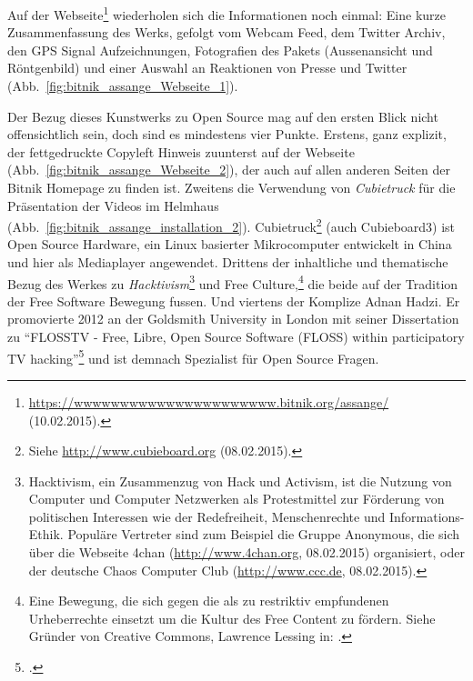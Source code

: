 \documentclass[
paper=164mm:234mm, %
pagesize, %
DIV=calc, %
10pt, %
parskip=half- %
]{scrbook}
\begin{document}
Auf der Webseite\footnote{\url{https://wwwwwwwwwwwwwwwwwwwwww.bitnik.org/assange/} (10.02.2015).} wiederholen sich die Informationen noch einmal: Eine kurze Zusammenfassung des Werks, gefolgt vom Webcam Feed, dem Twitter Archiv, den GPS Signal Aufzeichnungen, Fotografien des Pakets (Aussenansicht und Röntgenbild) und einer Auswahl an Reaktionen von Presse und Twitter (Abb.~\ref{fig:bitnik_assange_Webseite_1}).

Der Bezug dieses Kunstwerks zu Open Source mag auf den ersten Blick nicht offensichtlich sein, doch sind es mindestens vier Punkte. Erstens, ganz explizit, der fettgedruckte Copyleft Hinweis zuunterst auf der Webseite (Abb.~\ref{fig:bitnik_assange_Webseite_2}), der auch auf allen anderen Seiten der Bitnik Homepage zu finden ist. Zweitens die Verwendung von \emph{Cubietruck} für die Präsentation der Videos im Helmhaus (Abb.~\ref{fig:bitnik_assange_installation_2}). Cubietruck\footnote{Siehe \url{http://www.cubieboard.org} (08.02.2015).} (auch Cubieboard3) ist Open Source Hardware, ein Linux basierter Mikrocomputer entwickelt in China und hier als Mediaplayer angewendet. Drittens der inhaltliche und thematische Bezug des Werkes zu \emph{Hacktivism}\footnote{Hacktivism, ein Zusammenzug von Hack und Activism, ist die Nutzung von Computer und Computer Netzwerken als Protestmittel zur Förderung von politischen Interessen wie der Redefreiheit, Menschenrechte und Informations-Ethik. Populäre Vertreter sind zum Beispiel die Gruppe Anonymous, die sich über die Webseite 4chan (\url{http://www.4chan.org}, 08.02.2015) organisiert, oder der deutsche Chaos Computer Club (\url{http://www.ccc.de}, 08.02.2015).} und Free Culture,\footnote{Eine Bewegung, die sich gegen die als zu restriktiv empfundenen Urheberrechte einsetzt um die Kultur des Free Content zu fördern. Siehe Gründer von Creative Commons, Lawrence Lessing in: \cite[276-286]{Lessing:2004}.} die beide auf der Tradition der Free Software Bewegung fussen. Und viertens der Komplize Adnan Hadzi. Er promovierte 2012 an der Goldsmith University in London mit seiner Dissertation zu \enquote{FLOSSTV - Free, Libre, Open Source Software (FLOSS) within participatory TV hacking}\footnote{\cite{Hadzi:2012}.} und ist demnach Spezialist für Open Source Fragen.
\end{document}
